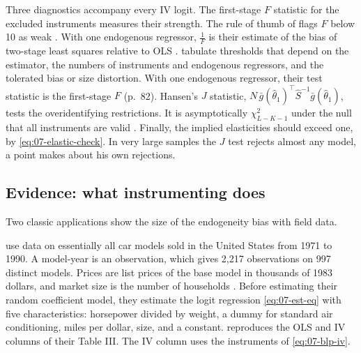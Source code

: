 Three diagnostics accompany every IV logit. The first-stage $F$ statistic for the excluded instruments measures their
strength. The rule of thumb of \citet{StaigerStock1997} flags $F$ below 10 as weak \citep[p.~101]{StockYogo2005}.
With one endogenous regressor, $\frac{1}{F}$ is their estimate of the bias of two-stage least squares relative to OLS
\citep[p.~566]{StaigerStock1997}. \citet[Tables~5.1--5.4]{StockYogo2005} tabulate thresholds that depend on the
estimator, the numbers of instruments and endogenous regressors, and the tolerated bias or size distortion. With one
endogenous regressor, their test statistic is the first-stage $F$ (p.~82).
Hansen's $J$ statistic, $N\,\bar g(\hat\theta_1)^\top \hat S^{-1}\bar g(\hat\theta_1)$, tests the
overidentifying restrictions. It is asymptotically $\chi^2_{L - K - 1}$ under the null that all instruments are valid
\citep{Hansen1982}. Finally, the implied elasticities should exceed one, by \eqref{eq:07-elastic-check}. In very
large samples the $J$ test rejects almost any model, a point \citet[n.~23]{Nevo2001} makes about his own rejections.

\subsection{Evidence: what instrumenting does}\label{sec:07-iv-evidence}

Two classic applications show the size of the endogeneity bias with field data.

\citet{BerryLevinsohnPakes1995} use data on essentially all car models sold in the United States from 1971 to 1990.
A model-year is an observation, which gives 2,217 observations on 997 distinct models. Prices are list prices of the
base model in thousands of 1983 dollars, and market size is the number of households
\citep[p.~869]{BerryLevinsohnPakes1995}. Before estimating their random coefficient model, they estimate the logit
regression \eqref{eq:07-est-eq} with five characteristics: horsepower divided by weight, a dummy for standard air
conditioning, miles per dollar, size, and a constant.  reproduces the OLS and IV columns of
their Table III. The IV column uses the instruments of \eqref{eq:07-blp-iv}.


